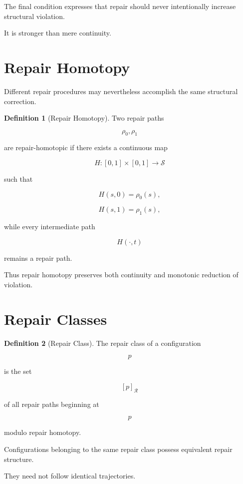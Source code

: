 \documentclass[11pt,oneside]{book}
\numberwithin{equation}{chapter}
\theoremstyle{definition}
\newtheorem{definition}{Definition}[chapter]
\theoremstyle{plain}
\newcommand{\State}{\mathcal{S}}
\newcommand{\Repair}{\mathcal{R}}
\begin{document}
The final condition expresses that repair should never intentionally
increase structural violation.

It is stronger than mere continuity.

\section{Repair Homotopy}

Different repair procedures may nevertheless accomplish the same structural
correction.

\begin{definition}[Repair Homotopy]

Two repair paths

\[
\rho_0,
\rho_1
\]

are repair-homotopic if there exists a continuous map

\[
H:
[0,1]\times[0,1]
\rightarrow
\State
\]

such that

\[
H(s,0)=\rho_0(s),
\]

\[
H(s,1)=\rho_1(s),
\]

while every intermediate path

\[
H(\cdot,t)
\]

remains a repair path.

\end{definition}

Thus repair homotopy preserves both continuity and monotonic reduction of
violation.

\section{Repair Classes}

\begin{definition}[Repair Class]

The repair class of a configuration

\[
p
\]

is the set

\[
[p]_{\Repair}
\]

of all repair paths beginning at

\[
p
\]

modulo repair homotopy.

\end{definition}

Configurations belonging to the same repair class possess equivalent repair
structure.

They need not follow identical trajectories.
\end{document}
